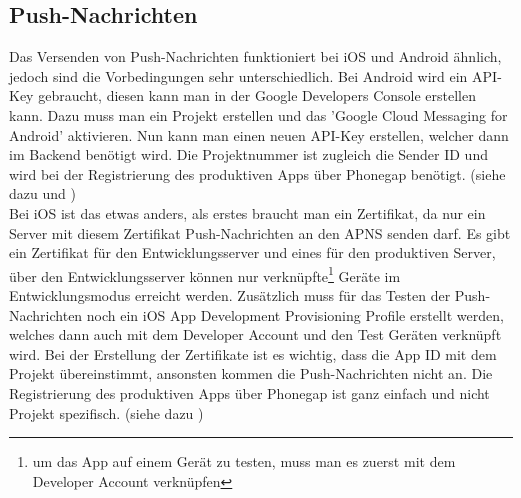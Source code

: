 \subsection{Push-Nachrichten}
Das Versenden von Push-Nachrichten funktioniert bei iOS und Android ähnlich, jedoch sind die Vorbedingungen sehr unterschiedlich. Bei Android wird ein API-Key gebraucht, diesen kann man in der Google Developers Console erstellen kann. Dazu muss man ein Projekt erstellen und das 'Google Cloud Messaging for Android' aktivieren. Nun kann man einen neuen API-Key erstellen, welcher dann im Backend benötigt wird. Die Projektnummer ist zugleich die Sender ID und wird bei der Registrierung des produktiven Apps über Phonegap benötigt. (siehe dazu \cite{android_push_android} und \cite{devgirl_push_android})\\


Bei iOS ist das etwas anders, als erstes braucht man ein Zertifikat, da nur ein Server mit diesem Zertifikat Push-Nachrichten an den APNS senden darf. Es gibt ein Zertifikat für den Entwicklungsserver und eines für den produktiven Server, über den Entwicklungsserver können nur verknüpfte\footnote{um das App auf einem Gerät zu testen, muss man es zuerst mit dem Developer Account verknüpfen} Geräte im Entwicklungsmodus erreicht werden. Zusätzlich muss für das Testen der Push-Nachrichten noch ein iOS App Development Provisioning Profile erstellt werden, welches dann auch mit dem Developer Account und den Test Geräten verknüpft wird. Bei der Erstellung der Zertifikate ist es wichtig, dass die App ID mit dem Projekt übereinstimmt, ansonsten kommen die Push-Nachrichten nicht an. Die Registrierung des produktiven Apps über Phonegap ist ganz einfach und nicht Projekt spezifisch. (siehe dazu \cite{ios_push})\\

